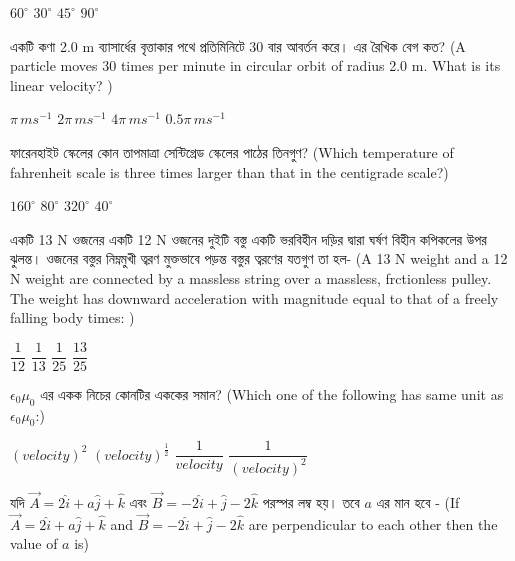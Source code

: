 \documentclass[addpoints]{exam}
\begin{document}
\begin{questions}
\begin{oneparchoices}
\choice $ 60^{\circ} $
\choice $ 30^{\circ} $
\choice $ 45^{\circ} $
\choice $ 90^{\circ} $
\end{oneparchoices}


\question  একটি কণা 2.0 m ব্যাসার্ধের বৃত্তাকার পথে প্রতিমিনিটে 30 বার আবর্তন করে। এর রৈখিক বেগ কত? (A particle moves 30 times per minute in circular orbit of radius 2.0 m. What is its linear velocity? )

\begin{oneparchoices}
\choice $ \pi\,ms^{-1} $
\choice $ 2\pi\,ms^{-1} $
\choice $ 4\pi\,ms^{-1} $
\choice $ 0.5\pi\,ms^{-1} $
\end{oneparchoices}

\question  ফারেনহাইট স্কেলের কোন তাপমাত্রা সেন্টিগ্রেড স্কেলের পাঠের তিনগুণ? (Which temperature of fahrenheit scale is three times larger than that in the centigrade scale?)

\begin{oneparchoices}
\choice $ 160^{\circ} $
\choice $ 80^{\circ} $
\choice $ 320^{\circ} $
\choice $ 40^{\circ} $
\end{oneparchoices}

\question একটি 13 N ওজনের একটি 12 N ওজনের দুইটি বস্তু একটি ভরবিহীন দড়ির দ্বারা ঘর্ষণ বিহীন কপিকলের উপর ঝুলন্ত।  ওজনের বস্তুর নিম্নমুখী ত্বরণ মুক্তভাবে পড়ন্ত বস্তুর ত্বরণের যতগুণ তা হল- (A 13 N weight and a 12 N weight are connected by a massless string over a massless, frctionless pulley. The weight has downward acceleration with magnitude equal to that of a freely falling body times: ) 
 
\begin{oneparchoices}
\choice $ \dfrac{1}{12} $
\choice $ \dfrac{1}{13} $
\choice $ \dfrac{1}{25} $
\choice $ \dfrac{13}{25} $
\end{oneparchoices}

\question $ \epsilon_{0}\mu_{0} $ এর একক নিচের কোনটির এককের সমান? (Which one of the following has same unit as $ \epsilon_{0}\mu_{0} $:)

\begin{oneparchoices}
\choice $ (velocity)^{2} $
\choice $ (velocity)^{\frac{1}{2}} $
\choice $ \dfrac{1}{velocity} $
\choice $ \dfrac{1}{(velocity)^{2}} $
\end{oneparchoices}


\question  যদি $ \vec{A} = 2\hat{i} + a\hat{j} + \hat{k} $ এবং $ \vec{B} = -2\hat{i}+\hat{j}-2\hat{k} $ পরস্পর লম্ব হয়। তবে $ a $ এর মান হবে - (If $ \vec{A} = 2\hat{i} + a\hat{j} + \hat{k} $ and $ \vec{B} = -2\hat{i}+\hat{j}-2\hat{k} $ are perpendicular to each other then the value of $ a $ is)


\end{questions}
\end{document}
